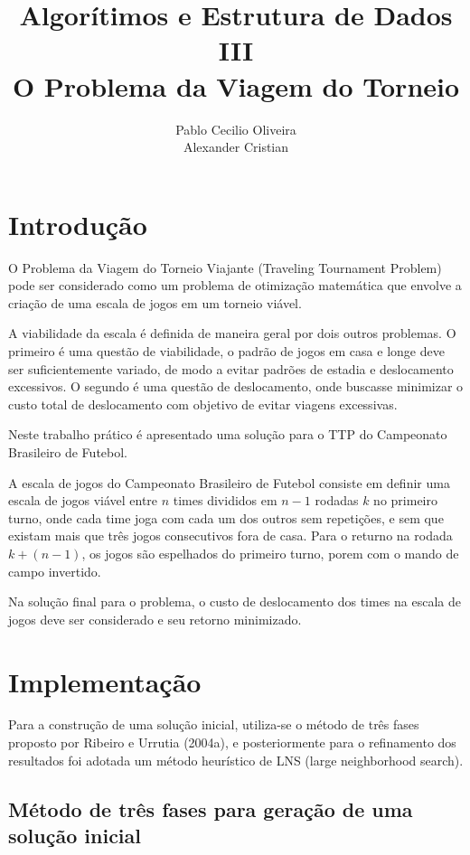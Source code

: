 \documentclass[12pt,a4paper]{article}
\author{Pablo Cecilio Oliveira\\
	Alexander Cristian}
\title{Algorítimos e Estrutura de Dados III\\
O Problema da Viagem do Torneio}
\date{}
\begin{document}
\maketitle

\section{Introdução}

O Problema da Viagem do Torneio Viajante (Traveling Tournament Problem) pode ser considerado como um problema de otimização matemática que envolve a criação de uma escala de jogos em um torneio viável.

A viabilidade da escala é definida de maneira geral por dois  outros problemas. O primeiro é uma questão de viabilidade, o padrão de jogos em casa e longe deve ser suficientemente variado, de modo a evitar padrões de estadia e deslocamento excessivos. O segundo é uma questão de deslocamento, onde buscasse minimizar o custo total de deslocamento com objetivo de evitar viagens excessivas.

Neste trabalho prático é apresentado uma solução para o TTP do Campeonato Brasileiro de Futebol.

A escala de jogos do Campeonato Brasileiro de Futebol consiste em definir uma escala de jogos viável entre $n$ times divididos em $n-1$ rodadas $k$ no primeiro turno, onde cada time joga com cada um dos outros sem repetições, e sem que existam mais que três jogos consecutivos fora de casa. Para o returno na rodada $k + (n - 1)$, os jogos são espelhados do primeiro turno, porem com o mando de campo invertido.

Na solução final para o problema, o custo de deslocamento dos times na escala de jogos deve ser considerado e seu retorno minimizado.

\section{Implementação}

Para a construção de uma solução inicial, utiliza-se o método de três fases proposto por Ribeiro e Urrutia (2004a)\cite{urrutia:heuristics}, e posteriormente para o refinamento dos resultados foi adotada um método heurístico de LNS (large neighborhood search).

\subsection{Método de três fases para geração de uma solução inicial}
\end{document}
